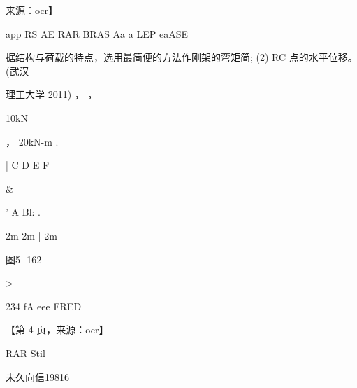\documentclass[UTF8,12pt,a4paper,openany]{ctexbook}
\begin{document}
\begin{enumerate}[label=\textbf{\arabic*.},leftmargin=2em]
来源：ocr】\par app RS AE RAR BRAS Aa a LEP eaASE\par 据结构与荷载的特点，选用最简便的方法作刚架的弯矩简; (2) RC 点的水平位移。 (武汉\par 理工大学 2011)            ，                ，\par 10kN\par ，               20kN-m            .\par |                C     D      E        F\par \&\par ’               A             Bl:                   .\par 2m   2m   |   2m\par 图5- 162\par >\par 234                                                          fA eee FRED\par \par 【第 4 页，来源：ocr】\par RAR Stil\par 未久向信19816
\end{enumerate}
\end{document}
